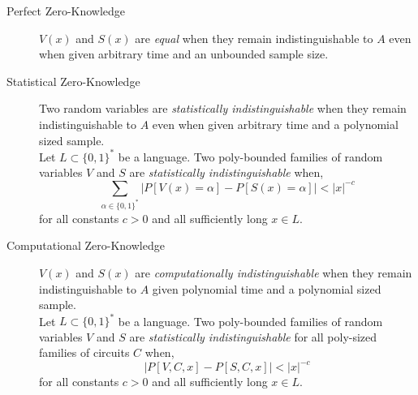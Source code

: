 \begin{description}
	\item[Perfect Zero-Knowledge]
	$V(x)$ and $S(x)$ are \textit{equal} when they remain indistinguishable to $A$ even when given arbitrary time and an unbounded sample size.
	\item[Statistical Zero-Knowledge] Two random variables are \textit{statistically indistinguishable} when they remain indistinguishable to $A$ even when given arbitrary time and a polynomial sized sample.
	\bigskip
	\\
	Let $L \subset \{0,1\}^*$ be a language. Two poly-bounded families of random variables $V$ and $S$ are \textit{statistically indistinguishable} when,
	$$\sum_{\alpha \in \{0,1\}^*} |P[V(x) = \alpha] - P[S(x) = \alpha]| < |x|^{-c}$$
	for all constants $c>0$ and all sufficiently long $x \in L$.
	\item[Computational Zero-Knowledge] $V(x)$ and $S(x)$ are \textit{computationally indistinguishable} when they remain indistinguishable to $A$ given polynomial time and a polynomial sized sample.
	\bigskip
	\\
	Let $L \subset \{0,1\}^*$ be a language. Two poly-bounded families of random variables $V$ and $S$ are \textit{statistically indistinguishable} for all poly-sized families of circuits $C$ when,
	$$|P[V, C, x] - P[S, C, x]| < |x|^{-c}$$
	for all constants $c>0$ and all sufficiently long $x \in L$.

	
	
	\end{description}



